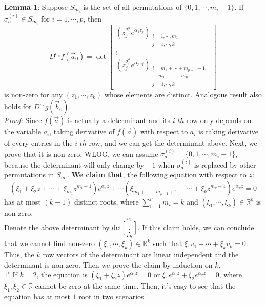 \documentclass[12pt]{article}
\begin{document}
\textbf{Lemma 1}: Suppose $S_{m_i}$ is the set of all permutations of $\{0,1,\cdots,m_{i}-1\}$. If $\sigma_{a}^{(i)}\in S_{m_i}$ for $i=1,\cdots,p$, then 
\[ D^{\sigma_{a}}f(\vec{a}_{0})= \det
	\left[ \begin{array}{ccc}
		(z_{j}^{\sigma_{i}^{a}}e^{\alpha_{1}z_{j}})_{\substack{i=1,\cdots,m_{1}\\j=1,\cdots,k}}\\
	\vdots\\
	(z_{j}^{\sigma_{i}^{a}}e^{\alpha_{p}z_{j}})_{\substack{i=m_1+\cdots+m_{p-1}+1,\\ \cdots ,m_{1}+\cdots +m_{p} \\j=1,\cdots,k}}
	\end{array}
	\right]
\]
is non-zero for any $(z_{1},\cdots,z_{k})$ whose elements are distinct. Analogous result also holds for $D^{\sigma_{b}}g(\vec{b}_{0})$.\\
\emph{Proof: }Since $f(\vec{a})$ is actually a determinant and its $i$-$th$ row only depends on the variable $a_{i}$, taking derivative of $f(\vec{a})$ with respect to $a_{i}$ is taking derivative of every entries in the $i$-$th$ row, and we can get the determinant above. Next, we prove that it is non-zero. WLOG, we can assume $\sigma_{a}^{(i)}=\{0,1,\cdots,m_{i}-1\}$, because the determinant will only change by $-1$ when $\sigma_{a}^{(i)}$ is replaced by other permutations in $S_{m_i}$. \textbf{We claim that}, the following equation with respect to $z$:
$$(\xi_{1}+\xi_{2}z+\cdots+\xi_{m_1}z^{m_{i}-1})e^{\alpha_{1}z}+\cdots(\xi_{m_{1}+\cdots+m_{p-1}+1}+\cdots+\xi_{k}z^{m_{p}-1})e^{\alpha_{p}z}=0$$ has at most $(k-1)$ distinct roots, where $\sum_{i=1}^{p}m_i=k$ and $(\xi_{1},\cdots,\xi_{k})\in\mathbb{R}^{k}$ is non-zero.\\
Denote the above determinant by $\det\Bigl[\begin{smallmatrix} v_{1}\\\vdots\\ v_{k} \end{smallmatrix}\Bigr]$. If this claim holds, we can conclude that we cannot find non-zero $(\xi_{1},\cdots,\xi_{k})\in\mathbb{R}^{k}$ such that $\xi_{1}v_{1}+\cdots+\xi_{k}v_{k}=0$. Thus, the $k$ row vectors of the determinant are linear independent and the determinant is non-zero. Then we prove the claim by induction on $k$.\\
$1^{\circ}$ If $k=2$, the equation is $(\xi_{1}+\xi_{2}z)e^{\alpha_{1}z}=0$ or $\xi_{1}e^{\alpha_{1}z}+\xi_{2}e^{\alpha_{2}z}=0$, where $\xi_{1},\xi_{2}\in\mathbb{R}$ cannot be zero at the same time. Then, it's easy to see that the equation has at most $1$ root in two scenarios.\\
\end{document}
